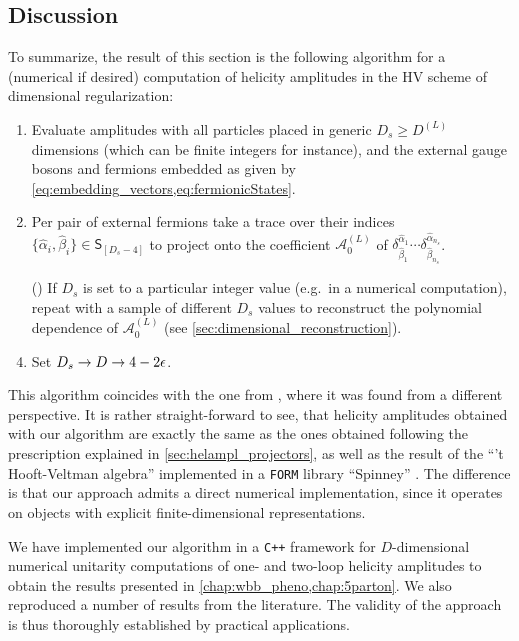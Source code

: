 \subsection{Discussion}
\label{sec:dshel_discussion}

To summarize, the result of this section is the following algorithm for
a (numerical if desired) computation of helicity amplitudes in the HV scheme of dimensional regularization:
\begin{enumerate}[label={\arabic*.}]
  \item Evaluate amplitudes with all particles placed in generic $D_s \geq D^{(L)}$ dimensions (which can be finite integers for instance), 
    and the external gauge bosons and fermions embedded as given by \cref{eq:embedding_vectors,eq:fermionicStates}.
  \item Per pair of external fermions take a trace over their indices $\{\hat{\alpha}_i,\hat{\beta}_i\} \in \mathsf{S}_{[D_s-4]}$ 
    to project onto the coefficient $\mathcal{A}_0^{(L)}$ of $\delta^{\hat{\alpha}_1}_{\hat{\beta}_1}\cdots \delta^{\hat{\alpha}_{n_s}}_{\hat{\beta}_{n_s}}$.
  \item[(\arabic{enumi})]  If $D_s$ is set to a particular integer value (e.g.\ in a numerical computation),
    repeat with a sample of different $D_s$ values to reconstruct the polynomial dependence of $\mathcal{A}_0^{(L)}$ (see \cref{sec:dimensional_reconstruction}).
  \item Set $D_s\to D\to 4-2\epsilon$.
\end{enumerate}
This algorithm coincides with the one from \cite{Anger:2018ove}, where it was found from a different perspective.
It is rather straight-forward to see, that
helicity amplitudes obtained 
with our algorithm are exactly the same as the ones 
obtained following the prescription explained in \cref{sec:helampl_projectors}, 
as well as the result of the ``'t Hooft-Veltman algebra'' implemented in a \texttt{FORM} library ``Spinney'' \cite{Cullen2010}.
The difference is that our approach admits a direct numerical implementation, since it
operates on objects with explicit finite-dimensional representations.

We have implemented our algorithm in a \texttt{C++} framework for $D$-dimensional numerical unitarity computations 
of one- and two-loop helicity amplitudes to obtain the results presented in \cref{chap:wbb_pheno,chap:5parton}.
We also reproduced a number of results from the literature. 
The validity of the approach is thus thoroughly established by practical applications.

